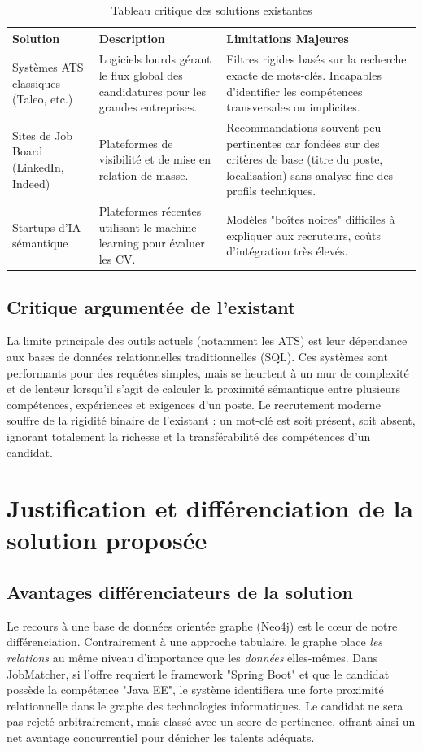\documentclass[12pt,a4paper]{report}
\begin{document}
\begin{table}[h]
\centering
\begin{tabular}{|p{3cm}|p{5cm}|p{5cm}|}
\hline
\textbf{Solution} & \textbf{Description} & \textbf{Limitations Majeures} \\
\hline
Systèmes ATS classiques (Taleo, etc.) & Logiciels lourds gérant le flux global des candidatures pour les grandes entreprises. & Filtres rigides basés sur la recherche exacte de mots-clés. Incapables d'identifier les compétences transversales ou implicites. \\
\hline
Sites de Job Board (LinkedIn, Indeed) & Plateformes de visibilité et de mise en relation de masse. & Recommandations souvent peu pertinentes car fondées sur des critères de base (titre du poste, localisation) sans analyse fine des profils techniques. \\
\hline
Startups d'IA sémantique & Plateformes récentes utilisant le machine learning pour évaluer les CV. & Modèles "boîtes noires" difficiles à expliquer aux recruteurs, coûts d'intégration très élevés. \\
\hline
\end{tabular}
\caption{Tableau critique des solutions existantes}
\end{table}

\subsection{Critique argumentée de l'existant}
La limite principale des outils actuels (notamment les ATS) est leur dépendance aux bases de données relationnelles traditionnelles (SQL). Ces systèmes sont performants pour des requêtes simples, mais se heurtent à un mur de complexité et de lenteur lorsqu'il s'agit de calculer la proximité sémantique entre plusieurs compétences, expériences et exigences d'un poste. Le recrutement moderne souffre de la rigidité binaire de l'existant : un mot-clé est soit présent, soit absent, ignorant totalement la richesse et la transférabilité des compétences d'un candidat.

\section{Justification et différenciation de la solution proposée}

\subsection{Avantages différenciateurs de la solution}
Le recours à une base de données orientée graphe (Neo4j) est le cœur de notre différenciation. Contrairement à une approche tabulaire, le graphe place \textit{les relations} au même niveau d'importance que les \textit{données} elles-mêmes. 
Dans JobMatcher, si l'offre requiert le framework "Spring Boot" et que le candidat possède la compétence "Java EE", le système identifiera une forte proximité relationnelle dans le graphe des technologies informatiques. Le candidat ne sera pas rejeté arbitrairement, mais classé avec un score de pertinence, offrant ainsi un net avantage concurrentiel pour dénicher les talents adéquats.
\end{document}
